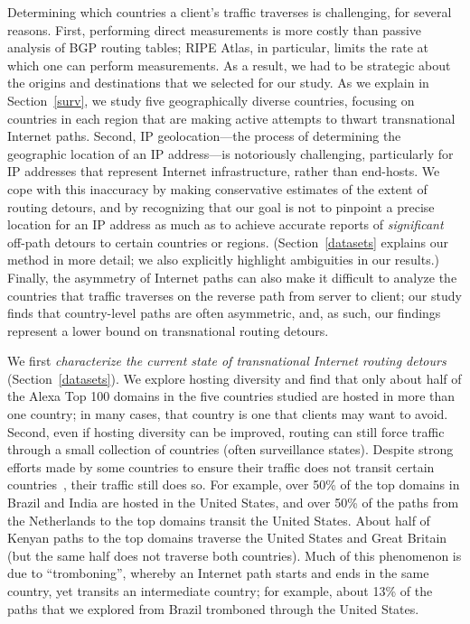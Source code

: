 Determining which countries a client's traffic traverses is challenging, for
several reasons.  First, performing direct measurements is more costly
than passive analysis of BGP routing tables; RIPE Atlas, in particular,
limits the rate at which one can perform measurements.  As a result, we
had to be strategic about the origins and destinations that we selected
for our study. As we explain in Section~\ref{surv}, we study five
geographically diverse countries, 
focusing on countries in each region that are
making active attempts to thwart transnational Internet paths.  Second,
IP geolocation---the process of determining the geographic location of an
IP address---is notoriously challenging, particularly for IP addresses
that represent Internet infrastructure, rather than end-hosts. We cope
with this inaccuracy by making conservative estimates of the extent of
routing detours, and by recognizing that our goal is not to pinpoint a
precise location for an IP address as much as to achieve accurate
reports of {\em significant} off-path detours to certain countries or
regions. (Section~\ref{datasets} explains our method in more detail; we
also explicitly highlight ambiguities in our results.) Finally, the
asymmetry of Internet paths can also make it difficult to analyze the
countries that traffic traverses on the reverse path from server to
client; our study finds that country-level paths are often asymmetric,
and, as such, our findings represent a lower bound on transnational
routing detours.

We first {\em characterize the current state of transnational Internet
routing detours} (Section~\ref{datasets}).  We explore hosting diversity
and find that only about half of the Alexa Top 100 domains in the five
countries studied are hosted in more than one country; in many cases,
that country is one that clients may want to avoid. Second, even if
hosting diversity can be improved, routing can still force traffic
through a small collection of countries (often surveillance
states). Despite strong efforts made by some countries to ensure their
traffic does not transit certain countries~\cite{brazil_history,
  brazil_break_from_US, brazil_conference, brazil_conference2,
  brazil_human_rights}, their traffic still does so.  For example, over 50\% of the
top domains in Brazil and India are hosted in the United States, and
over 50\% of the paths from the Netherlands to the top domains transit
the United States.  About half of Kenyan paths to the top domains
traverse the United States and Great Britain (but the same half does not
traverse both countries).  Much of this phenomenon is due to
``tromboning'', whereby an Internet path starts and ends in the same country,
yet transits an intermediate country; for example, about 13\% of the
paths that we explored from Brazil tromboned through the United States.

